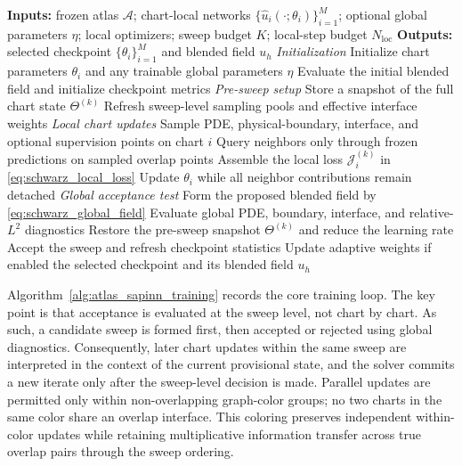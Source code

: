 \documentclass[sort&compress]{svjour3} %
\newcommand\StateX{\Statex\hspace{\algorithmicindent}}
\begin{document}
\begin{algorithm}[htbp]
\caption{Fixed-atlas SA-PINN training by multiplicative Schwarz sweeps}
\label{alg:atlas_sapinn_training}
\small
\begin{algorithmic}[1]
\Statex \textbf{Inputs:} frozen atlas $\mathcal{A}$; chart-local networks $\{\widehat{u}_i(\cdot;\theta_i)\}_{i=1}^M$;
\StateX optional global parameters $\eta$; local optimizers; sweep budget $K$; local-step budget $N_{\mathrm{loc}}$
\Statex \textbf{Outputs:} selected checkpoint $\{\theta_i\}_{i=1}^M$ and blended field $u_h$
\Statex \textit{Initialization}
\State Initialize chart parameters $\theta_i$ and any trainable global parameters $\eta$
\State Evaluate the initial blended field and initialize checkpoint metrics
    \Statex \textit{Pre-sweep setup}
    \State Store a snapshot of the full chart state $\Theta^{(k)}$
    \State Refresh sweep-level sampling pools and effective interface weights
        \Statex \textit{Local chart updates}
                \State Sample PDE, physical-boundary, interface, and optional supervision points on chart $i$
                \State Query neighbors only through frozen predictions on sampled overlap points
                \State Assemble the local loss $\mathcal{J}_i^{(k)}$ in \eqref{eq:schwarz_local_loss}
                \State Update $\theta_i$ while all neighbor contributions remain detached
            \EndFor
        \EndFor
    \EndFor
    \Statex \textit{Global acceptance test}
    \State Form the proposed blended field by \eqref{eq:schwarz_global_field}
    \State Evaluate global PDE, boundary, interface, and relative-$L^2$ diagnostics
        \State Restore the pre-sweep snapshot $\Theta^{(k)}$ and reduce the learning rate
    \Else
        \State Accept the sweep and refresh checkpoint statistics
        \State Update adaptive weights if enabled
    \EndIf
\EndFor
\State \Return the selected checkpoint and its blended field $u_h$
\end{algorithmic}
\end{algorithm}

Algorithm~\ref{alg:atlas_sapinn_training} records the core training loop. The key point is that acceptance is evaluated at the sweep level, not chart by chart. As such, a candidate sweep is formed first, then accepted or rejected using global diagnostics. Consequently, later chart updates within the same sweep are interpreted in the context of the current provisional state, and the solver commits a new iterate only after the sweep-level decision is made. Parallel updates are permitted only within non-overlapping graph-color groups; no two charts in the same color share an overlap interface. This coloring preserves independent within-color updates while retaining multiplicative information transfer across true overlap pairs through the sweep ordering.
\end{document}
